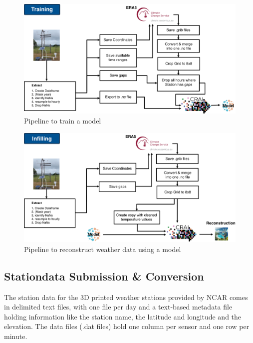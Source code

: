 \begin{figure}
    \centering
    \includegraphics[width=450pt]{resources/images/training_pipeline.png}
    \caption{Pipeline to train a model}
    \label{fig: training_pipeline}
\end{figure}

\begin{figure}
    \centering
    \includegraphics[width=450pt]{resources/images/infilling_pipeline.png}
    \caption{Pipeline to reconstruct weather data using a model}
    \label{fig: infilling_pipeline}
\end{figure}

\subsection{Stationdata Submission \& Conversion}

The station data for the 3D printed weather stations provided by NCAR comes in delimited text files, with one file per day and a text-based metadata file holding information like the station name, the latitude and longitude and the elevation.
The data files (.dat files) hold one column per sensor and one row per minute.


